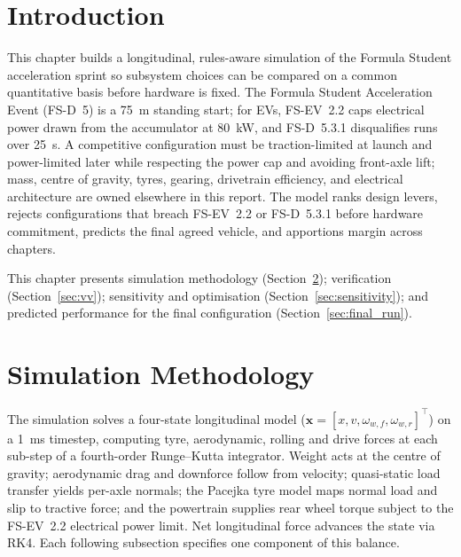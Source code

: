 
\section{Introduction}
\label{sec:intro}

This chapter builds a longitudinal, rules-aware simulation of the Formula Student acceleration sprint so subsystem choices can be compared on a common quantitative basis before hardware is fixed.
The Formula Student Acceleration Event (FS-D~5) is a \SI{75}{\metre}
standing start; for EVs, FS-EV~2.2 caps electrical power drawn from the
accumulator at \SI{80}{\kilo\watt}, and FS-D~5.3.1 disqualifies runs
over \SI{25}{\second}. A competitive configuration must be
traction-limited at launch and power-limited later while respecting
the power cap and avoiding front-axle lift; mass, centre of gravity,
tyres, gearing, drivetrain efficiency, and electrical architecture are
owned elsewhere in this report. The model ranks design levers, rejects configurations that
breach FS-EV~2.2 or FS-D~5.3.1 before hardware commitment, predicts the
final agreed vehicle, and apportions margin across chapters.

This chapter presents simulation methodology
(Section~\ref{sec:methodology}); verification
(Section~\ref{sec:vv}); sensitivity and optimisation
(Section~\ref{sec:sensitivity}); and predicted performance for the
final configuration (Section~\ref{sec:final_run}).

\section{Simulation Methodology}
\label{sec:methodology}

The simulation solves a four-state longitudinal model
($\mathbf{x} = [x, v, \omega_{w,f}, \omega_{w,r}]^\top$) on a
\SI{1}{\milli\second} timestep, computing tyre, aerodynamic, rolling
and drive forces at each sub-step of a fourth-order Runge--Kutta
integrator. Weight acts at the centre of gravity; aerodynamic drag and
downforce follow from velocity; quasi-static load transfer yields
per-axle normals; the Pacejka tyre model maps normal load and slip to
tractive force; and the powertrain supplies rear wheel torque subject to
the FS-EV~2.2 electrical power limit. Net longitudinal force advances the
state via RK4. Each following subsection specifies one component of this
balance.

